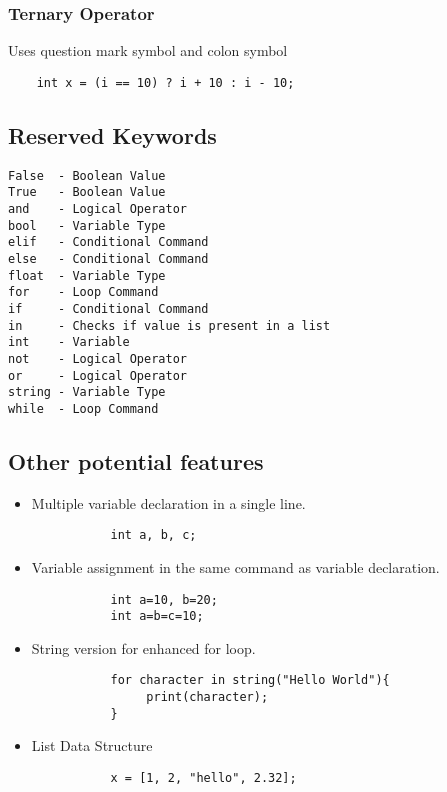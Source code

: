 \documentclass[12pt,letterpaper]{article}
\begin{document}
\subsubsection{Ternary Operator}
Uses question mark symbol and colon symbol
\begin{verbatim}
    int x = (i == 10) ? i + 10 : i - 10;
\end{verbatim}

\subsection{Reserved Keywords}
\begin{verbatim}
False  - Boolean Value
True   - Boolean Value
and    - Logical Operator
bool   - Variable Type
elif   - Conditional Command
else   - Conditional Command
float  - Variable Type
for    - Loop Command
if     - Conditional Command
in     - Checks if value is present in a list
int    - Variable
not    - Logical Operator
or     - Logical Operator
string - Variable Type
while  - Loop Command
\end{verbatim}

\subsection{Other potential features}
\begin{itemize}
    \item Multiple variable declaration in a single line.
        \begin{verbatim}
           int a, b, c;
        \end{verbatim}
    \item Variable assignment in the same command as variable declaration.
        \begin{verbatim}
           int a=10, b=20;
           int a=b=c=10;
        \end{verbatim}

    \item String version for enhanced for loop.
        \begin{verbatim}
           for character in string("Hello World"){
                print(character);
           }
        \end{verbatim}

    \item List Data Structure
        \begin{verbatim}
           x = [1, 2, "hello", 2.32];
        \end{verbatim}
\end{itemize}
\end{document}
